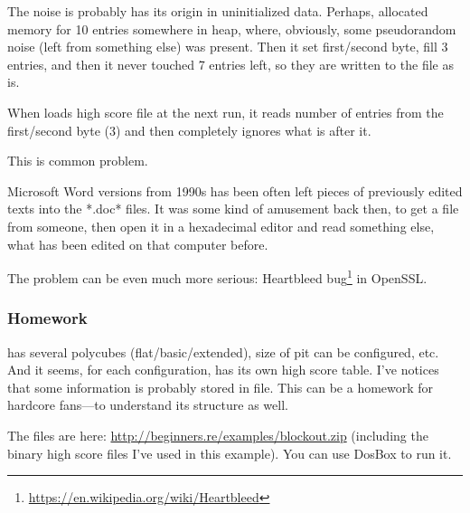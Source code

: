 The noise is probably has its origin in uninitialized data.
Perhaps,  allocated memory for 10 entries somewhere in heap, where, obviously,
some pseudorandom noise (left from something else) was present.
Then it set first/second byte, fill 3 entries, and then it never touched 7 entries left, so they are written
to the file as is.

When  loads high score file at the next run, it reads number of entries from the first/second byte (3) and
then completely ignores what is after it.

This is common problem.

Microsoft Word versions from 1990s has been often left pieces of previously edited texts into the *.doc* files.
It was some kind of amusement back then, to get a  file from someone,
then open it in a hexadecimal editor and read something else,
what has been edited on that computer before.

The problem can be even much more serious: Heartbleed bug\footnote{\url{https://en.wikipedia.org/wiki/Heartbleed}}
in OpenSSL.

\subsubsection{Homework}

 has several polycubes (flat/basic/extended), size of pit can be configured, etc.
And it seems, for each configuration,  has its own high score table.
I've notices that some information is probably stored in  file.
This can be a homework for hardcore  fans---to understand its structure as well.

The  files are here: \url{http://beginners.re/examples/blockout.zip}
(including the binary high score files
I've used in this example).
You can use DosBox to run it.

